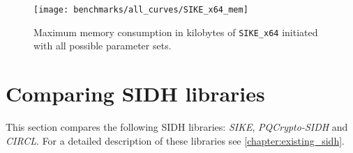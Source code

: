 \begin{figure}[H]
  \centering
  \texttt{[image: benchmarks/all\_curves/SIKE\_x64\_mem]}
  \caption[Maximum memory consumption for all parameter sets via \texttt{SIKE\_x64}]
  {Maximum memory consumption in kilobytes of \texttt{SIKE\_x64} initiated with all possible parameter sets.}
  \label{fig:results_all_curves_mem}
\end{figure}

\section{Comparing SIDH libraries}\label{sec:analysis_sidh_libs}

This section compares the following SIDH libraries: \textit{SIKE}, \textit{PQCrypto-SIDH} and \textit{CIRCL}. For a detailed description of these libraries see \autoref{chapter:existing_sidh}.

